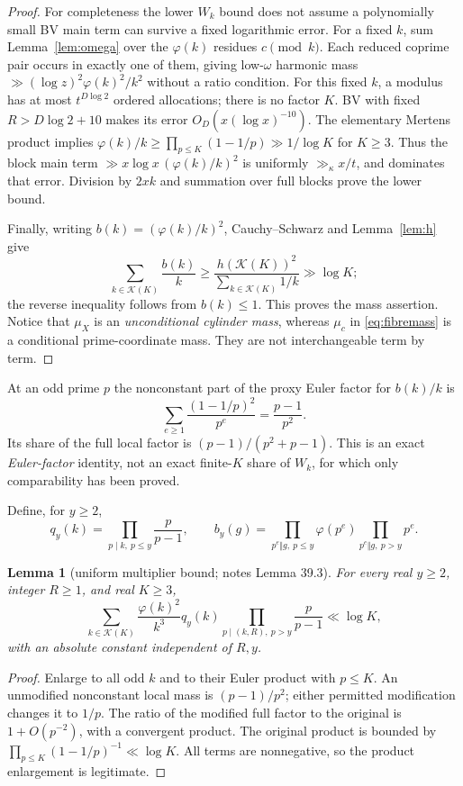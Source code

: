 \documentclass[10pt,reqno]{amsart}
\newtheorem{lemma}[theorem]{Lemma}
\theoremstyle{remark}
\newcommand{\K}{\mathcal K}
\begin{document}
\begin{proof}
For completeness the lower $W_k$ bound does not assume a polynomially
small BV main term can survive a fixed logarithmic error.  For a fixed $k$,
sum Lemma~\ref{lem:omega} over the $\varphi(k)$ residues $c\pmod k$.
Each reduced coprime pair occurs in exactly one of them, giving low-$\omega$
harmonic mass $\gg(\log z)^2\varphi(k)^2/k^2$ without a ratio condition.
For this fixed $k$, a modulus has at most $t^{D\log2}$ ordered allocations;
there is no factor $K$.  BV with fixed $R>D\log2+10$ makes its error
$O_D(x(\log x)^{-10})$.
The elementary Mertens product implies
$\varphi(k)/k\geq\prod_{p\leq K}(1-1/p)\gg1/\log K$ for $K\geq3$.
Thus the block main term
$\gg x\log x\,(\varphi(k)/k)^2$ is uniformly $\gg_\kappa x/t$,
and dominates that error.  Division by $2xk$ and summation over full
blocks prove the lower bound.

Finally, writing $b(k)=(\varphi(k)/k)^2$, Cauchy--Schwarz and
Lemma~\ref{lem:h} give
\[
 \sum_{k\in\K(K)}\frac{b(k)}k
 \geq\frac{h(\K(K))^2}{\sum_{k\in\K(K)}1/k}\gg\log K;
\]
the reverse inequality follows from $b(k)\leq1$.  This proves the mass
assertion.  Notice that $\mu_X$ is an \emph{unconditional cylinder mass},
whereas $\mu_c$ in \eqref{eq:fibremass} is a conditional prime-coordinate
mass.  They are not interchangeable term by term.
\end{proof}

At an odd prime $p$ the nonconstant part of the proxy Euler factor for
$b(k)/k$ is
\[
 \sum_{e\geq1}\frac{(1-1/p)^2}{p^e}=\frac{p-1}{p^2}.
\]
Its share of the full local factor is $(p-1)/(p^2+p-1)$.
This is an exact \emph{Euler-factor} identity, not an exact finite-$K$
share of $W_k$, for which only comparability has been proved.

Define, for $y\geq2$,
\[
 q_y(k)=\prod_{p\mid k,\ p\leq y}\frac p{p-1},\qquad
 b_y(g)=\prod_{p^e\Vert g,\ p\leq y}\varphi(p^e)
                    \prod_{p^e\Vert g,\ p>y}p^e.
\]
\begin{lemma}[uniform multiplier bound; notes Lemma 39.3]\label{lem:euler}
For every real $y\geq2$, integer $R\geq1$, and real $K\geq3$,
\begin{equation}\label{eq:euler}
 \sum_{k\in\K(K)}\frac{\varphi(k)^2}{k^3}q_y(k)
            \prod_{p\mid(k,R),\ p>y}\frac p{p-1}\ll\log K,
\end{equation}
with an absolute constant independent of $R,y$.
\end{lemma}
\begin{proof}
Enlarge to all odd $k$ and to their Euler product with $p\leq K$.
An unmodified nonconstant local mass is $(p-1)/p^2$; either permitted
modification changes it to $1/p$.  The ratio of the modified full factor
to the original is $1+O(p^{-2})$, with a convergent product.  The original
product is bounded by $\prod_{p\leq K}(1-1/p)^{-1}\ll\log K$.
All terms are nonnegative, so the product enlargement is legitimate.
\end{proof}
\end{document}
